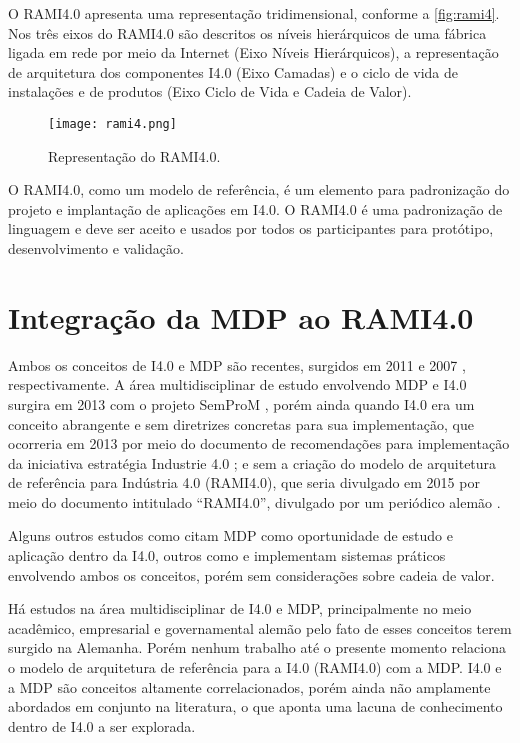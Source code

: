 O RAMI4.0 apresenta uma representação tridimensional, conforme a \autoref{fig:rami4}. Nos três eixos do RAMI4.0 são descritos os níveis hierárquicos de uma fábrica ligada em rede por meio da Internet (Eixo Níveis Hierárquicos), a representação de arquitetura dos componentes I4.0 (Eixo Camadas) e o ciclo de vida de instalações e de produtos (Eixo Ciclo de Vida e Cadeia de Valor).

\begin{figure}[htb]
  \centering
  \texttt{[image: rami4.png]}
  \caption{Representação do RAMI4.0.}
  \label{fig:rami4}
\end{figure}

O RAMI4.0, como um modelo de referência, é um elemento para padronização do projeto e implantação de aplicações em I4.0. O RAMI4.0 é uma padronização de linguagem e deve ser aceito e usados por todos os participantes para protótipo, desenvolvimento e validação.

\section{Integração da MDP ao RAMI4.0}
\label{sec:integracao-mdp-rami}

Ambos os conceitos de I4.0 e MDP são recentes, surgidos em 2011 \cite{kagermann2011industrie} e 2007 \cite{wahlster2007digitalmemory}, respectivamente. A área multidisciplinar de estudo envolvendo MDP e I4.0 surgira em 2013 com o projeto SemProM \cite{wahlster2013semprom}, porém ainda quando I4.0 era um conceito abrangente e sem diretrizes concretas para sua implementação, que ocorreria em 2013 por meio do documento de recomendações para implementação da iniciativa estratégia Industrie 4.0 \cite{kagermann2013recommendations}; e sem a criação do modelo de arquitetura de referência para Indústria 4.0 (RAMI4.0), que seria divulgado em 2015 por meio do documento intitulado ``RAMI4.0'', divulgado por um periódico alemão \cite{hankel2015rami}.

Alguns outros estudos como  citam MDP como oportunidade de estudo e aplicação dentro da I4.0, outros como  e  implementam sistemas práticos envolvendo ambos os conceitos, porém sem considerações sobre cadeia de valor.

Há estudos na área multidisciplinar de I4.0 e MDP, principalmente no meio acadêmico, empresarial e governamental alemão pelo fato de esses conceitos terem surgido na Alemanha. Porém nenhum trabalho até o presente momento relaciona o modelo de arquitetura de referência para a I4.0 (RAMI4.0) com a MDP. I4.0 e a MDP são conceitos altamente correlacionados, porém ainda não amplamente abordados em conjunto na literatura, o que aponta uma lacuna de conhecimento dentro de I4.0 a ser explorada.

